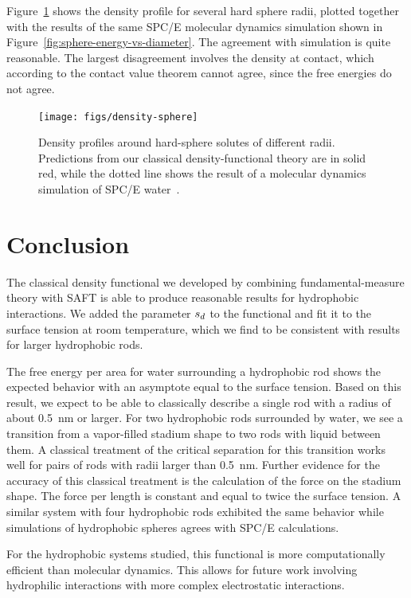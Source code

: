 \documentclass[letterpaper,twocolumn,amsmath,amssymb,prb]{revtex4-1}
\begin{document}
Figure~\ref{fig:density-sphere} shows the density profile for several
hard sphere radii, plotted together with the results of the same
SPC/E molecular dynamics simulation shown in
Figure~\ref{fig:sphere-energy-vs-diameter}\cite{huang2001shs}.  The
agreement with simulation is quite reasonable.  The largest
disagreement involves the density at contact, which according to the
contact value theorem cannot agree, since the free energies do not
agree.

\begin{figure}
\begin{center}
\texttt{[image: figs/density-sphere]}
\end{center}
\caption{ Density profiles around hard-sphere solutes of different radii. Predictions
  from our classical density-functional theory are in solid red, while
  the dotted line shows the result of a molecular dynamics simulation
  of SPC/E water~\cite{huang2001shs}.  }
\label{fig:density-sphere}
\end{figure}

\section{Conclusion}

The classical density functional we developed by combining fundamental-measure 
theory with SAFT is able to produce reasonable results for hydrophobic interactions.
We added the parameter $s_d$ to the functional and fit it to the surface tension
at room temperature, which we find to be consistent with results for larger hydrophobic
rods. 

The free energy per area for water surrounding a hydrophobic rod shows the
expected behavior with an asymptote equal to the surface tension.
Based on this result, we expect to be
able to classically describe a single rod with a radius of about 0.5~nm or larger. 
For two hydrophobic rods surrounded by water, we see a transition from a vapor-filled
stadium shape to two rods with liquid between them. A
classical treatment of the critical separation for this transition
works well for pairs of rods with radii larger than 0.5~nm.  Further evidence for the
accuracy of this classical treatment is the calculation of the force on the
stadium shape. The force per length is constant and equal to twice the
surface tension. A similar system with four hydrophobic rods exhibited the same
behavior while simulations of hydrophobic spheres agrees with
SPC/E calculations.

For the hydrophobic systems studied, this functional is more computationally 
efficient than molecular dynamics. This allows for future work
involving hydrophilic interactions with more complex electrostatic interactions.


\end{document}
